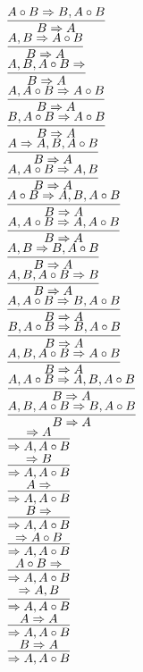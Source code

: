 \documentclass[11pt]{article}
\begin{document}
\begin{center}
\bigskip
\\$\infer{B\Rightarrow A}{A\circ B\Rightarrow B, A\circ B}$
\bigskip
\\$\infer{B\Rightarrow A}{A, B\Rightarrow A\circ B}$
\bigskip
\\$\infer{B\Rightarrow A}{A, B, A\circ B\Rightarrow }$
\bigskip
\\$\infer{B\Rightarrow A}{A, A\circ B\Rightarrow A\circ B}$
\bigskip
\\$\infer{B\Rightarrow A}{B, A\circ B\Rightarrow A\circ B}$
\bigskip
\\$\infer{B\Rightarrow A}{A\Rightarrow A, B, A\circ B}$
\bigskip
\\$\infer{B\Rightarrow A}{A, A\circ B\Rightarrow A, B}$
\bigskip
\\$\infer{B\Rightarrow A}{A\circ B\Rightarrow A, B, A\circ B}$
\bigskip
\\$\infer{B\Rightarrow A}{A, A\circ B\Rightarrow A, A\circ B}$
\bigskip
\\$\infer{B\Rightarrow A}{A, B\Rightarrow B, A\circ B}$
\bigskip
\\$\infer{B\Rightarrow A}{A, B, A\circ B\Rightarrow B}$
\bigskip
\\$\infer{B\Rightarrow A}{A, A\circ B\Rightarrow B, A\circ B}$
\bigskip
\\$\infer{B\Rightarrow A}{B, A\circ B\Rightarrow B, A\circ B}$
\bigskip
\\$\infer{B\Rightarrow A}{A, B, A\circ B\Rightarrow A\circ B}$
\bigskip
\\$\infer{B\Rightarrow A}{A, A\circ B\Rightarrow A, B, A\circ B}$
\bigskip
\\$\infer{B\Rightarrow A}{A, B, A\circ B\Rightarrow B, A\circ B}$
\bigskip
\\$\infer{\Rightarrow A, A\circ B}{\Rightarrow A}$
\bigskip
\\$\infer{\Rightarrow A, A\circ B}{\Rightarrow B}$
\bigskip
\\$\infer{\Rightarrow A, A\circ B}{A\Rightarrow }$
\bigskip
\\$\infer{\Rightarrow A, A\circ B}{B\Rightarrow }$
\bigskip
\\$\infer{\Rightarrow A, A\circ B}{\Rightarrow A\circ B}$
\bigskip
\\$\infer{\Rightarrow A, A\circ B}{A\circ B\Rightarrow }$
\bigskip
\\$\infer{\Rightarrow A, A\circ B}{\Rightarrow A, B}$
\bigskip
\\$\infer{\Rightarrow A, A\circ B}{A\Rightarrow A}$
\bigskip
\\$\infer{\Rightarrow A, A\circ B}{B\Rightarrow A}$

\end{center}
\end{document}
